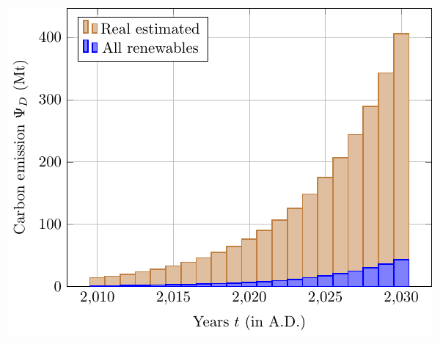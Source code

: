 \documentclass[12pt]{article}
\begin{document}
\begin{figure}[!t]
	\centering
	\caption{}
	\label{}
	\includegraphics{figures/trends/datacenter_emission.pdf}
\end{figure}



\end{document}
